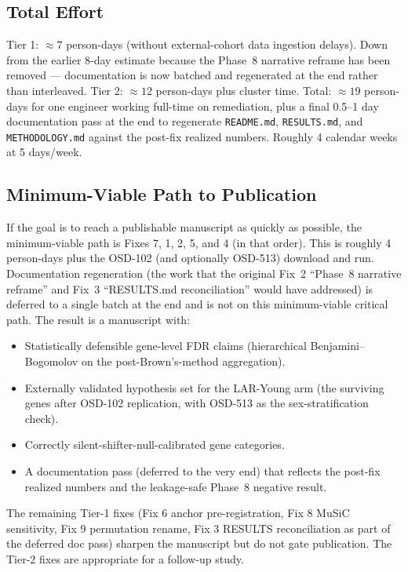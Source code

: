 \documentclass[11pt]{article}
\newcommand{\code}[1]{\texttt{#1}}
\begin{document}
\subsection{Total Effort}

Tier 1: $\approx 7$ person-days (without external-cohort data ingestion delays). Down from the earlier 8-day estimate because the Phase~8 narrative reframe has been removed --- documentation is now batched and regenerated at the end rather than interleaved.
Tier 2: $\approx 12$ person-days plus cluster time.
Total: $\approx 19$ person-days for one engineer working full-time on remediation, plus a final 0.5--1 day documentation pass at the end to regenerate \code{README.md}, \code{RESULTS.md}, and \code{METHODOLOGY.md} against the post-fix realized numbers. Roughly 4 calendar weeks at 5 days/week.

\subsection{Minimum-Viable Path to Publication}

If the goal is to reach a publishable manuscript as quickly as possible, the minimum-viable path is Fixes 7, 1, 2, 5, and 4 (in that order). This is roughly 4 person-days plus the OSD-102 (and optionally OSD-513) download and run. Documentation regeneration (the work that the original Fix~2 ``Phase~8 narrative reframe'' and Fix~3 ``RESULTS.md reconciliation'' would have addressed) is deferred to a single batch at the end and is not on this minimum-viable critical path. The result is a manuscript with:

\begin{itemize}[leftmargin=*]
\item Statistically defensible gene-level FDR claims (hierarchical Benjamini--Bogomolov on the post-Brown's-method aggregation).
\item Externally validated hypothesis set for the LAR-Young arm (the surviving genes after OSD-102 replication, with OSD-513 as the sex-stratification check).
\item Correctly silent-shifter-null-calibrated gene categories.
\item A documentation pass (deferred to the very end) that reflects the post-fix realized numbers and the leakage-safe Phase~8 negative result.
\end{itemize}

\noindent The remaining Tier-1 fixes (Fix 6 anchor pre-registration, Fix 8 MuSiC sensitivity, Fix 9 permutation rename, Fix 3 RESULTS reconciliation as part of the deferred doc pass) sharpen the manuscript but do not gate publication. The Tier-2 fixes are appropriate for a follow-up study.
\end{document}
